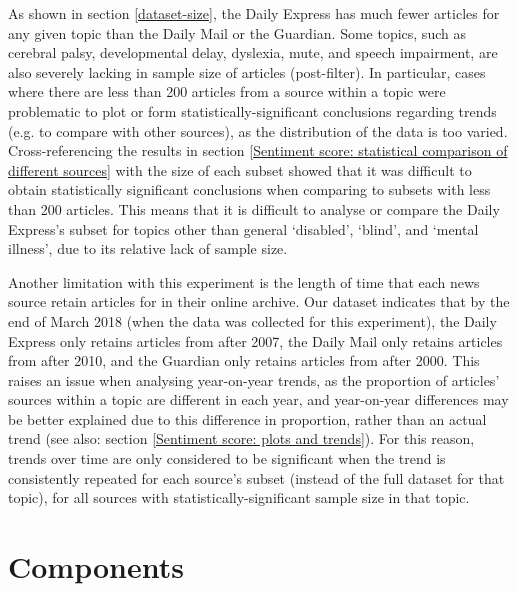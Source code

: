 \documentclass{report}
\newcommand{\textapprox}{\raisebox{0.5ex}{\texttildelow}}  %
\begin{document}
As shown in section \ref{dataset-size}, the Daily Express has much fewer articles for any given topic than the Daily Mail or the Guardian.
Some topics, such as cerebral palsy, developmental delay, dyslexia, mute, and speech impairment, are also severely lacking in sample size of articles (post-filter).
In particular, cases where there are less than \textapprox200 articles from a source within a topic were problematic to plot or form statistically-significant conclusions regarding trends (e.g. to compare with other sources), as the distribution of the data is too varied.
Cross-referencing the results in section \ref{Sentiment score: statistical comparison of different sources} with the size of each subset showed that it was difficult to obtain statistically significant conclusions when comparing to subsets with less than \textapprox200 articles.
This means that it is difficult to analyse or compare the Daily Express's subset for topics other than general `disabled', `blind', and `mental illness', due to its relative lack of sample size.

Another limitation with this experiment is the length of time that each news source retain articles for in their online archive.
Our dataset indicates that by the end of March 2018 (when the data was collected for this experiment), the Daily Express only retains articles from after \textapprox2007, the Daily Mail only retains articles from after \textapprox2010, and the Guardian only retains articles from after \textapprox2000. 
This raises an issue when analysing year-on-year trends, as the proportion of articles' sources within a topic are different in each year, and year-on-year differences may be better explained due to this difference in proportion, rather than an actual trend (see also: section \ref{Sentiment score: plots and trends}).
For this reason, trends over time are only considered to be significant when the trend is consistently repeated for each source's subset (instead of the full dataset for that topic), for all sources with statistically-significant sample size in that topic. 

\section{Components} \label{Components}
\end{document}
